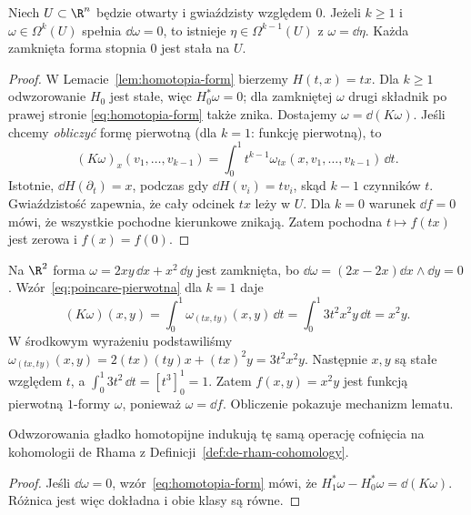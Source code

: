 \begin{twierdzenie}
\label{thm:lemat-poincare-formy}
Niech $U\subset\R^n$ będzie otwarty i gwiaździsty
względem $0$. Jeżeli $k\geq1$ i
$\omega\in\Omega^k(U)$ spełnia $\dd\omega=0$,
to istnieje $\eta\in\Omega^{k-1}(U)$ z
$\omega=\dd\eta$. Każda zamknięta forma stopnia
$0$ jest stała na $U$.
\end{twierdzenie}
\begin{proof}
W Lemacie~\ref{lem:homotopia-form} bierzemy
$H(t,x)=tx$. Dla $k\geq1$ odwzorowanie $H_0$
jest stałe, więc $H_0^*\omega=0$; dla zamkniętej
$\omega$ drugi składnik po prawej stronie
\eqref{eq:homotopia-form} także znika.
Dostajemy $\omega=\dd(K\omega)$.
Jeśli chcemy \emph{obliczyć} formę pierwotną
(dla $k=1$: funkcję pierwotną), to
\begin{equation}\label{eq:poincare-pierwotna}
 (K\omega)_x(v_1,\ldots,v_{k-1})
 =\int_0^1 t^{k-1}
   \omega_{tx}(x,v_1,\ldots,v_{k-1})\,\dd t.
\end{equation}
Istotnie, $\dd H(\partial_t)=x$, podczas gdy
$\dd H(v_i)=tv_i$, skąd $k-1$ czynników $t$.
Gwiaździstość zapewnia, że cały odcinek $tx$ leży w $U$.
Dla $k=0$ warunek $\dd f=0$ mówi, że wszystkie
pochodne kierunkowe znikają. Zatem pochodna
$t\mapsto f(tx)$ jest zerowa i $f(x)=f(0)$.
\end{proof}

\begin{przyklad}
Na $\R^2$ forma $\omega=2xy\,\dd x+x^2\,\dd y$
jest zamknięta, bo
$\dd\omega=(2x-2x)\dd x\wedge\dd y=0$.
Wzór~\eqref{eq:poincare-pierwotna} dla $k=1$ daje
\[
 (K\omega)(x,y)=\int_0^1
 \omega_{(tx,ty)}(x,y)\,\dd t
 =\int_0^1 3t^2x^2y\,\dd t=x^2y.
\]
W środkowym wyrażeniu podstawiliśmy
$\omega_{(tx,ty)}(x,y)=2(tx)(ty)x+(tx)^2y=3t^2x^2y$.
Następnie $x,y$ są stałe względem $t$, a
$\int_0^1 3t^2\,\dd t=[t^3]_0^1=1$.
Zatem $f(x,y)=x^2y$ jest funkcją pierwotną
$1$-formy $\omega$, ponieważ $\omega=\dd f$.
Obliczenie pokazuje mechanizm lematu.
\end{przyklad}

\begin{wniosek}
\label{cor:de-rham-homotopia}
Odwzorowania gładko homotopijne indukują tę samą
operację cofnięcia na kohomologii de Rhama
z Definicji~\ref{def:de-rham-cohomology}.
\end{wniosek}
\begin{proof}
Jeśli $\dd\omega=0$, wzór~\eqref{eq:homotopia-form}
mówi, że $H_1^*\omega-H_0^*\omega=\dd(K\omega)$.
Różnica jest więc dokładna i obie klasy są równe.
\end{proof}

